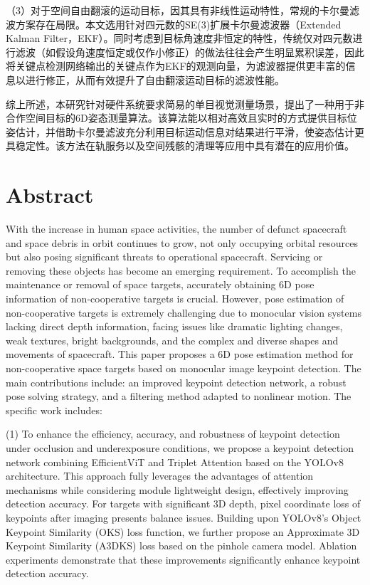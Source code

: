 （3）对于空间自由翻滚的运动目标，因其具有非线性运动特性，常规的卡尔曼滤波方案存在局限。本文选用针对四元数的SE(3)扩展卡尔曼滤波器（Extended Kalman Filter，EKF）。同时考虑到目标角速度非恒定的特性，传统仅对四元数进行滤波（如假设角速度恒定或仅作小修正）的做法往往会产生明显累积误差，因此将关键点检测网络输出的关键点作为EKF的观测向量，为滤波器提供更丰富的信息以进行修正，从而有效提升了自由翻滚运动目标的滤波性能。

综上所述，本研究针对硬件系统要求简易的单目视觉测量场景，提出了一种用于非合作空间目标的6D姿态测量算法。该算法能以相对高效且实时的方式提供目标位姿估计，并借助卡尔曼滤波充分利用目标运动信息对结果进行平滑，使姿态估计更具稳定性。该方法在轨服务以及空间残骸的清理等应用中具有潜在的应用价值。

\intotoc\chapter*{\textbf{Abstract}}%

With the increase in human space activities, the number of defunct spacecraft and space debris in orbit continues to grow, not only occupying orbital resources but also posing significant threats to operational spacecraft. Servicing or removing these objects has become an emerging requirement. To accomplish the maintenance or removal of space targets, accurately obtaining 6D pose information of non-cooperative targets is crucial. However, pose estimation of non-cooperative targets is extremely challenging due to monocular vision systems lacking direct depth information, facing issues like dramatic lighting changes, weak textures, bright backgrounds, and the complex and diverse shapes and movements of spacecraft.
This paper proposes a 6D pose estimation method for non-cooperative space targets based on monocular image keypoint detection. The main contributions include: an improved keypoint detection network, a robust pose solving strategy, and a filtering method adapted to nonlinear motion. The specific work includes:

(1) To enhance the efficiency, accuracy, and robustness of keypoint detection under occlusion and underexposure conditions, we propose a keypoint detection network combining EfficientViT and Triplet Attention based on the YOLOv8 architecture. This approach fully leverages the advantages of attention mechanisms while considering module lightweight design, effectively improving detection accuracy. For targets with significant 3D depth, pixel coordinate loss of keypoints after imaging presents balance issues. Building upon YOLOv8's Object Keypoint Similarity (OKS) loss function, we further propose an Approximate 3D Keypoint Similarity (A3DKS) loss based on the pinhole camera model. Ablation experiments demonstrate that these improvements significantly enhance keypoint detection accuracy.

